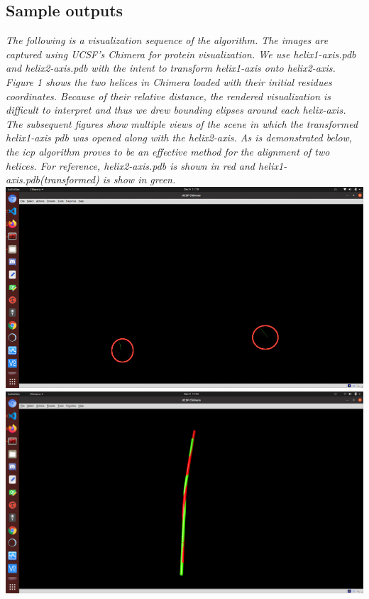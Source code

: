 \documentclass[12pt]{article}
\begin{document}
\subsection*{Sample outputs}
\emph{The following is a visualization sequence of the algorithm.  The images are captured using UCSF's Chimera for protein visualization. We use helix1-axis.pdb and helix2-axis.pdb with the intent to transform helix1-axis onto helix2-axis.  Figure 1 shows the two helices in Chimera loaded with their initial residues coordinates.  Because of their relative distance, the rendered visualization is difficult to interpret and thus we drew bounding elipses around each helix-axis.  The subsequent figures show multiple views of the scene in which the transformed helix1-axis pdb was opened along with the helix2-axis.  As is demonstrated below, the icp algorithm proves to be an effective method for the alignment of two helices.  For reference, helix2-axis.pdb is shown in red and helix1-axis.pdb(transformed) is show in green.}
\includegraphics[trim=0 20 10 50, clip,width=\textwidth] {PreTransformBounded.jpg}
\includegraphics[trim=0 20 10 50, clip,width=\textwidth] {TopView.png}
\end{document}
